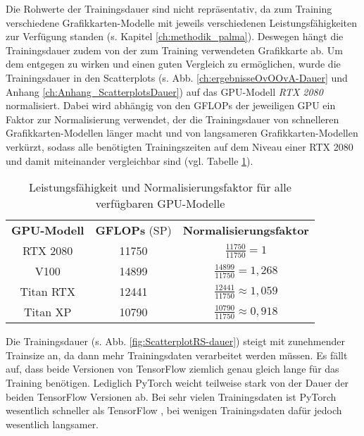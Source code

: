 Die Rohwerte der Trainingsdauer sind nicht repräsentativ, da zum Training verschiedene Grafikkarten-Modelle mit jeweils verschiedenen Leistungsfähigkeiten zur Verfügung standen (s. Kapitel \ref{ch:methodik_palma}). Deswegen hängt die Trainingsdauer zudem von der zum Training verwendeten Grafikkarte ab.
Um dem entgegen zu wirken und einen guten Vergleich zu ermöglichen, wurde die Trainingsdauer in den Scatterplots (s. Abb. \ref{ch:ergebnisseOvOOvA-Dauer} und Anhang \ref{ch:Anhang_ScatterplotsDauer}) auf das GPU-Modell \textit{RTX 2080} normalisiert. Dabei wird abhängig von den GFLOPs der jeweiligen GPU ein Faktor zur Normalisierung verwendet, der die Trainingsdauer von schnelleren Grafikkarten-Modellen länger macht und von langsameren Grafikkarten-Modellen verkürzt, sodass alle benötigten Trainingszeiten auf dem Niveau einer RTX 2080 und damit miteinander vergleichbar sind (vgl. Tabelle \ref{tab:GPUNormalisierung}).
\begin{table}[H]
\centering
\begin{tabular}{|c|c|c|}
\hline 
\multirow{2}{*}{\textbf{GPU-Modell}} & \multirow{2}{*}{\textbf{GFLOPs} (SP)} & \multirow{2}{*}{\textbf{Normalisierungsfaktor}}\\
& & \\
\hline 
\multirow{2}{*}{RTX 2080} & \multirow{2}{*}{11750} & \multirow{2}{*}{$\frac{11750}{11750}=1$} \\
& & \\
\hline 
\multirow{2}{*}{V100} & \multirow{2}{*}{14899} & \multirow{2}{*}{$\frac{14899}{11750}=1,268$} \\
& & \\
\hline 
\multirow{2}{*}{Titan RTX} & \multirow{2}{*}{12441} & \multirow{2}{*}{$\frac{12441}{11750} \approx 1,059$} \\
& & \\
\hline 
\multirow{2}{*}{Titan XP} & \multirow{2}{*}{10790} & \multirow{2}{*}{$\frac{10790}{11750}\approx 0,918$} \\
& & \\
\hline 
\end{tabular} 
\caption{Leistungsfähigkeit und Normalisierungsfaktor für alle verfügbaren GPU-Modelle \cite{palma2GPUs}}
\label{tab:GPUNormalisierung}
\end{table}

Die Trainingsdauer (s. Abb. \ref{fig:ScatterplotRS-dauer}) steigt mit zunehmender Trainsize an, da dann mehr Trainingsdaten verarbeitet werden müssen.
Es fällt auf, dass beide Versionen von TensorFlow \cite{tensorflow} ziemlich genau gleich lange für das Training benötigen. Lediglich PyTorch \cite{pytorch} weicht teilweise stark von der Dauer der beiden TensorFlow \cite{tensorflow} Versionen ab. Bei sehr vielen Trainingsdaten ist PyTorch \cite{pytorch} wesentlich schneller als TensorFlow \cite{tensorflow}, bei wenigen Trainingsdaten dafür jedoch wesentlich langsamer.

